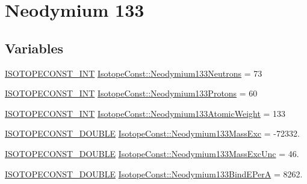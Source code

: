 \hypertarget{group___isotope_const-_neodymium-_nd133}{}\section{Neodymium 133}
\label{group___isotope_const-_neodymium-_nd133}
\subsection*{Variables}
\begin{DoxyCompactItemize}
\item 
\mbox{\hyperlink{group___isotope_const-_macros_ga5f18360b3e99483a35c32d789e62621c}{I\+S\+O\+T\+O\+P\+E\+C\+O\+N\+S\+T\+\_\+\+I\+NT}} \mbox{\hyperlink{group___isotope_const-_neodymium-_nd133_ga2ef6efcfed41b68f5e43a53324c3c6e4}{Isotope\+Const\+::\+Neodymium133\+Neutrons}} = 73
\item 
\mbox{\hyperlink{group___isotope_const-_macros_ga5f18360b3e99483a35c32d789e62621c}{I\+S\+O\+T\+O\+P\+E\+C\+O\+N\+S\+T\+\_\+\+I\+NT}} \mbox{\hyperlink{group___isotope_const-_neodymium-_nd133_ga635839c562f81fcdf0ba1e40a73b3df5}{Isotope\+Const\+::\+Neodymium133\+Protons}} = 60
\item 
\mbox{\hyperlink{group___isotope_const-_macros_ga5f18360b3e99483a35c32d789e62621c}{I\+S\+O\+T\+O\+P\+E\+C\+O\+N\+S\+T\+\_\+\+I\+NT}} \mbox{\hyperlink{group___isotope_const-_neodymium-_nd133_gaf42261be2f02e26a9d1f5be04c146f87}{Isotope\+Const\+::\+Neodymium133\+Atomic\+Weight}} = 133
\item 
\mbox{\hyperlink{group___isotope_const-_macros_ga8f45a7272ce02c0b4c65c44636ed719a}{I\+S\+O\+T\+O\+P\+E\+C\+O\+N\+S\+T\+\_\+\+D\+O\+U\+B\+LE}} \mbox{\hyperlink{group___isotope_const-_neodymium-_nd133_gad73118c9adb15d0d2404bcdcc4ec8fd3}{Isotope\+Const\+::\+Neodymium133\+Mass\+Exc}} = -\/72332.
\item 
\mbox{\hyperlink{group___isotope_const-_macros_ga8f45a7272ce02c0b4c65c44636ed719a}{I\+S\+O\+T\+O\+P\+E\+C\+O\+N\+S\+T\+\_\+\+D\+O\+U\+B\+LE}} \mbox{\hyperlink{group___isotope_const-_neodymium-_nd133_gadccdbe7fb0447d648e1f918bd61ec6a0}{Isotope\+Const\+::\+Neodymium133\+Mass\+Exc\+Unc}} = 46.
\item 
\mbox{\hyperlink{group___isotope_const-_macros_ga8f45a7272ce02c0b4c65c44636ed719a}{I\+S\+O\+T\+O\+P\+E\+C\+O\+N\+S\+T\+\_\+\+D\+O\+U\+B\+LE}} \mbox{\hyperlink{group___isotope_const-_neodymium-_nd133_ga958c7ae0b301579b601f07a90d3f0ebb}{Isotope\+Const\+::\+Neodymium133\+Bind\+E\+PerA}} = 8262.
\item 

\end{DoxyCompactItemize}

